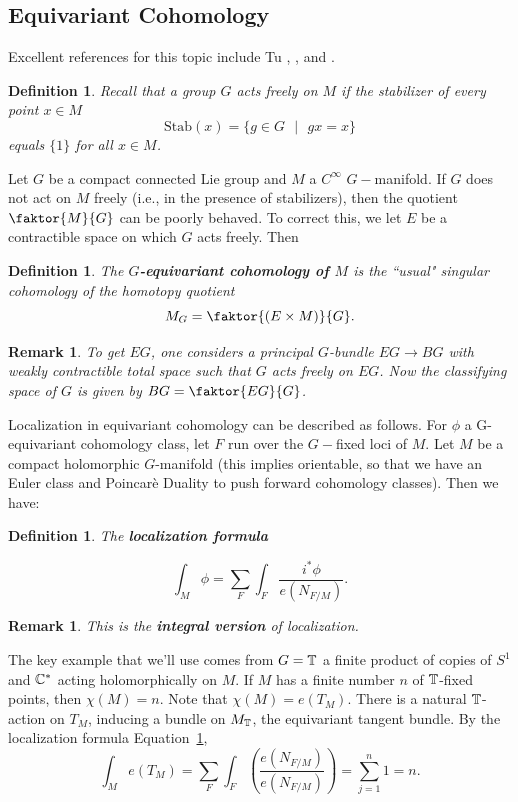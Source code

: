 \documentclass{amsart}
\newtheorem{remark}[theorem]{Remark}
\newtheorem{defn}[theorem]{Definition}
\begin{document}
\subsection{Equivariant Cohomology} Excellent references for this topic include Tu \cite{Tu+2020}, \cite{MSTextbook}, and \cite{coxkatxMSAG}. 


\begin{defn} Recall that a group $G$ acts freely on $M$ if the stabilizer of every point $x\in M$ \[ \text{Stab}(x) = \{g\in G\text{ }|\text{ }gx=x\} \] equals $\{1\}$ for all $x\in M$. 
\end{defn} 

Let $G$ be a compact connected Lie group and $M$ a $C^\infty$ $G-$manifold. If $G$ does not act on $M$ freely (i.e., in the presence of stabilizers), then the quotient $\faktor{M}{G}$ can be poorly behaved. To correct this, we let $E$ be a contractible space on which $G$ acts freely. Then

\begin{defn} The \textbf{$G$-equivariant cohomology of $M$} is the ``usual" singular cohomology of the homotopy quotient \[ M_G = \faktor{(E\times M)}{G}.\]  \end{defn} 

\begin{remark} To get $EG$, one considers a principal $G$-bundle $EG \rightarrow BG$ with weakly contractible total space such that $G$ acts freely on $EG$. Now the classifying space of $G$ is given by $BG = \faktor{EG}{G}$. \end{remark} 



Localization in equivariant cohomology can be described as follows. For $\phi$ a G-equivariant cohomology class, let $F$ run over the $G-$fixed loci of $M$. Let $M$ be a compact holomorphic $G$-manifold (this implies orientable, so that we have an Euler class and Poincar\`{e} Duality to push forward cohomology classes). Then we have: 

\begin{defn} The \textbf{localization formula}

\label{eqn: localiz}
\[ \int_M \phi = \sum_F \int_F \frac{ i^*\phi}{e(N_{F/M})}. \] \end{defn} 

\begin{remark} This is the \textbf{integral version} of localization. \end{remark} 

The key example that we'll use comes from $G=\mathbb{T}$ a finite product of copies of $S^1$ and $\mathbb{C}^*$ acting holomorphically on $M$. If $M$ has a finite number $n$ of $\mathbb{T}$-fixed points, then $\chi(M)=n$. Note that $\chi(M) = e(T_M)$. There is a natural $\mathbb{T}$-action on $T_M$, inducing a bundle on $M_{\mathbb{T}}$, the equivariant tangent bundle. By the localization formula Equation~\ref{eqn: localiz}, \[ \int_M e(T_M) = \sum_F \int_F \left( \frac{ e(N_{F/M})}{e(N_{F/M})} \right) = \sum_{j=1}^n 1 = n. \]
\end{document}
